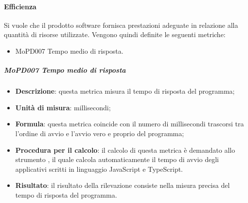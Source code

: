 \documentclass[../norme-di-progetto.tex]{subfiles}
\begin{document}
\paragraph{Efficienza}
Si vuole che il prodotto software fornisca prestazioni adeguate in relazione alla quantità di risorse utilizzate. Vengono quindi definite le seguenti metriche:
\begin{itemize}
  \item MoPD007 Tempo medio di risposta.
\end{itemize}
\subparagraph{MoPD007 Tempo medio di risposta}
\begin{itemize}
  \item \textbf{Descrizione}: questa metrica misura il tempo di risposta del programma;
  \item \textbf{Unità di misura}: millisecondi;
  \item \textbf{Formula}: questa metrica coincide con il numero di millisecondi trascorsi tra l'ordine di avvio e l'avvio vero e proprio del programma;
  \item \textbf{Procedura per il calcolo}: il calcolo di questa metrica è demandato allo strumento , il quale calcola automaticamente il tempo di avvio degli applicativi scritti in linguaggio JavaScript e TypeScript.
  \item \textbf{Risultato}: il risultato della rilevazione consiste nella misura precisa del tempo di risposta del programma.
\end{itemize}
\end{document}
